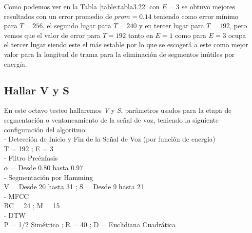 \vskip 1cm
Como podemos ver en la Tabla \ref{table:tabla3.22} con $E = 3$ se obtuvo mejores resultados con un error promedio de $prom = 0.14$ teniendo como error mínimo para $T = 256$, el segundo lugar para $T = 240$ y en tercer lugar para $T = 192$, pero vemos que el valor de error para $T = 192$ tanto en $E = 1$ como para $E = 3$ ocupa el tercer lugar siendo este el más estable por lo que se escogerá a este como mejor valor para la longitud de trama para la eliminación de segmentos inútiles por energía.

\subsection{Hallar V y S}
En este octavo testeo hallaremos \textit{V} y \textit{S}, parámetros usados para la etapa de segmentación o ventaneamiento de la señal de voz, teniendo la siguiente configuración del algoritmo:\\
- Detección de Inicio y Fin de la Señal de Voz (por función de energía) \\
\hspace*{1cm} T = 192 ; \qquad E = 3 \\
- Filtro Preénfasis \\
\hspace*{1cm} $\alpha$ = Desde 0.80 hasta 0.97 \\
- Segmentación por Hamming \\
\hspace*{1cm} V = Desde 20 hasta 31 ; \qquad S = Desde 9 hasta 21 \\
- MFCC \\
\hspace*{1cm} BC = 24 ; \qquad M = 15 \\
- DTW \\
\hspace*{1cm} P = 1/2 Simétrico ; \qquad R = 40 ; \qquad D = Euclidiana Cuadrática 

